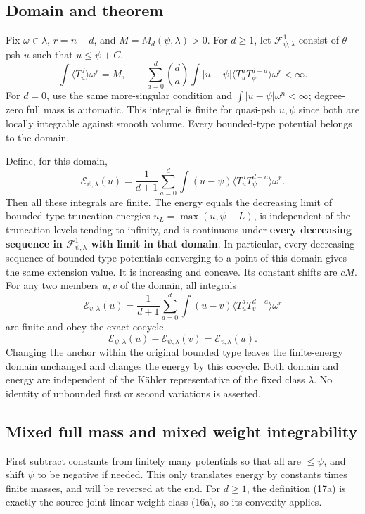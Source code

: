 \documentclass[
  11pt,
]{article}
\begin{document}
\subsection{Domain and theorem}\label{domain-and-theorem}

Fix \(\omega\in\lambda\), \(r=n-d\), and \(M=M_d(\psi,\lambda)>0\). For
\(d\geq1\), let \(\mathcal F^1_{\psi,\lambda}\) consist of
\(\theta\)-psh \(u\) such that \(u\leq\psi+C\), \[
\int\langle T_u^d\rangle\omega^r=M,
\qquad
\sum_{a=0}^d\binom da\int|u-\psi|
\langle T_u^aT_\psi^{d-a}\rangle\omega^r<\infty.
\tag{17a}
\] For \(d=0\), use the same more-singular condition and
\(\int|u-\psi|\omega^n<\infty\); degree-zero full mass is automatic.
This integral is finite for quasi-psh \(u,\psi\) since both are locally
integrable against smooth volume. Every bounded-type potential belongs
to the domain.

Define, for this domain, \[
\mathcal E_{\psi,\lambda}(u)
=\frac1{d+1}\sum_{a=0}^d\int(u-\psi)
\langle T_u^aT_\psi^{d-a}\rangle\omega^r.
\tag{18a}
\] Then all these integrals are finite. The energy equals the decreasing
limit of bounded-type truncation energies \(u_L=\max(u,\psi-L)\), is
independent of the truncation levels tending to infinity, and is
continuous under \textbf{every decreasing sequence in
\(\mathcal F^1_{\psi,\lambda}\) with limit in that domain}. In
particular, every decreasing sequence of bounded-type potentials
converging to a point of this domain gives the same extension value. It
is increasing and concave. Its constant shifts are \(cM\). For any two
members \(u,v\) of the domain, all integrals \[
\mathcal E_{v,\lambda}(u)
=\frac1{d+1}\sum_{a=0}^d\int(u-v)
\langle T_u^aT_v^{d-a}\rangle\omega^r
\tag{19a}
\] are finite and obey the exact cocycle \[
\mathcal E_{\psi,\lambda}(u)-\mathcal E_{\psi,\lambda}(v)
=\mathcal E_{v,\lambda}(u).
\tag{20a}
\] Changing the anchor within the original bounded type leaves the
finite-energy domain unchanged and changes the energy by this cocycle.
Both domain and energy are independent of the Kähler representative of
the fixed class \(\lambda\). No identity of unbounded first or second
variations is asserted.

\subsection{Mixed full mass and mixed weight
integrability}\label{mixed-full-mass-and-mixed-weight-integrability}

First subtract constants from finitely many potentials so that all are
\(\leq\psi\), and shift \(\psi\) to be negative if needed. This only
translates energy by constants times finite masses, and will be reversed
at the end. For \(d\geq1\), the definition (17a) is exactly the source
joint linear-weight class (16a), so its convexity applies.
\end{document}
